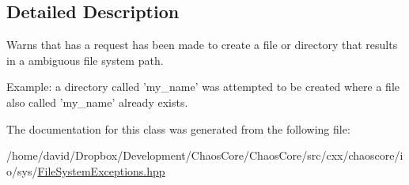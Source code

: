 \subsection{Detailed Description}
Warns that has a request has been made to create a file or directory that results in a ambiguous file system path. 

Example\-: a directory called 'my\-\_\-name' was attempted to be created where a file also called 'my\-\_\-name' already exists. 

The documentation for this class was generated from the following file\-:\begin{DoxyCompactItemize}
\item 
/home/david/\-Dropbox/\-Development/\-Chaos\-Core/\-Chaos\-Core/src/cxx/chaoscore/io/sys/\hyperlink{_file_system_exceptions_8hpp}{File\-System\-Exceptions.\-hpp}\end{DoxyCompactItemize}
